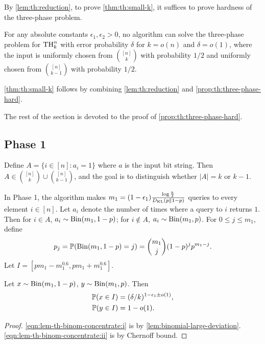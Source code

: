 By \cref{lem:th:reduction}, to prove \cref{thm:th:small-k}, it suffices to prove hardness of the three-phase problem.
\begin{proposition} \label{prop:th:three-phase-hard}
  For any absolute constants $\epsilon_1,\epsilon_2>0$, no algorithm can solve the three-phase problem for $\Threshold{n}{k}$ with error probability $\delta$ for $k=o(n)$ and $\delta=o(1)$, where the input is uniformly chosen from $\binom{[n]}k$ with probability $1/2$ and uniformly chosen from $\binom{[n]}{k-1}$ with probability $1/2$.
\end{proposition}
\cref{thm:th:small-k} follows by combining \cref{lem:th:reduction} and \cref{prop:th:three-phase-hard}.

The rest of the section is devoted to the proof of \cref{prop:th:three-phase-hard}.

\subsection{Phase 1} \label{sec:th-small:phase-1}
Define $A = \{i\in [n]: a_i = 1\}$ where $a$ is the input bit string.
Then $A \in \binom{[n]}{k} \cup \binom{[n]}{k-1}$, and the goal is to distinguish whether $|A|=k$ or $k-1$.

In Phase 1, the algorithm makes $m_1 = (1-\epsilon_1) \frac{\log \frac k\delta}{\DKL}$ queries to every element $i\in [n]$.
Let $a_i$ denote the number of times where a query to $i$ returns $1$.
Then for $i\in A$, $a_i \sim \Bin(m_1, 1-p)$; for $i\not \in A$, $a_i\sim \Bin(m_1, p)$.
For $0\le j\le m_1$, define
\begin{align*}
  p_j = \bP(\Bin(m_1,1-p)=j) = \binom{m_1}j (1-p)^j p^{m_1-j}.
\end{align*}
Let $I = \left[p m_1 - m_1^{0.6}, p m_1 + m_1^{0.6}\right]$.
\begin{lemma} \label{lem:th:binom-concentrate}
  Let $x\sim \Bin(m_1, 1-p)$, $y\sim \Bin(m_1, p)$.
  Then
  \begin{align}
    \label{eqn:lem-th-binom-concentrate:i} \bP(x\in I) &= (\delta/k)^{1-\epsilon_1 \pm o(1)}, \\
    \label{eqn:lem-th-binom-concentrate:ii} \bP(y\in I) &= 1-o(1).
  \end{align}
\end{lemma}
\begin{proof}
  \cref{eqn:lem-th-binom-concentrate:i} is by \cref{lem:binomial-large-deviation}.
  \cref{eqn:lem-th-binom-concentrate:ii} is by Chernoff bound.
\end{proof}

